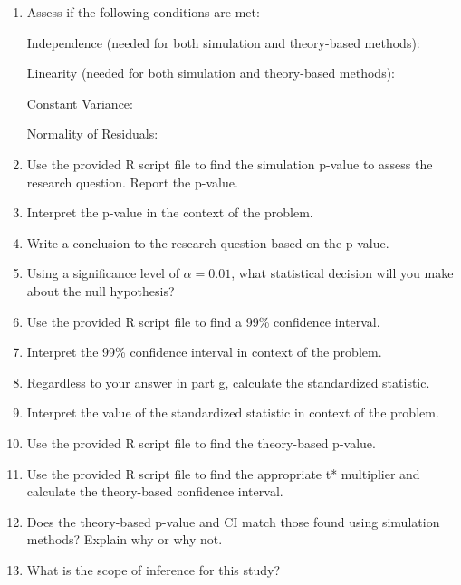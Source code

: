 \documentclass[
]{report}
\begin{document}
\begin{enumerate}
\def\labelenumi{\alph{enumi}.}
\setcounter{enumi}{5}
\item
  Assess if the following conditions are met:

  Independence (needed for both simulation and theory-based methods):
  \vspace{0.8in}

  Linearity (needed for both simulation and theory-based methods):
  \vspace{0.8in}

  Constant Variance:
  \vspace{0.8in}

  Normality of Residuals:
  \vspace{0.8in}
\item
  Use the provided R script file to find the simulation p-value to assess the research question. Report the p-value.
  \vspace{0.3in}
\item
  Interpret the p-value in the context of the problem.
  \vspace{0.8in}
\item
  Write a conclusion to the research question based on the p-value.
  \vspace{0.8in}
\item
  Using a significance level of \(\alpha = 0.01\), what statistical decision will you make about the null hypothesis?
  \vspace{0.3in}
\item
  Use the provided R script file to find a 99\% confidence interval.
  \vspace{0.3in}
\item
  Interpret the 99\% confidence interval in context of the problem.
  \vspace{0.7in}
\item
  Regardless to your answer in part g, calculate the standardized statistic.
  \vspace{0.4in}
\item
  Interpret the value of the standardized statistic in context of the problem.
  \vspace{0.7in}
\item
  Use the provided R script file to find the theory-based p-value.
  \vspace{0.3in}
\item
  Use the provided R script file to find the appropriate t* multiplier and calculate the theory-based confidence interval.
  \vspace{0.5in}
\item
  Does the theory-based p-value and CI match those found using simulation methods? Explain why or why not.
  \vspace{0.7in}
\item
  What is the scope of inference for this study?
  \vspace{0.7in}
\end{enumerate}
\end{document}
